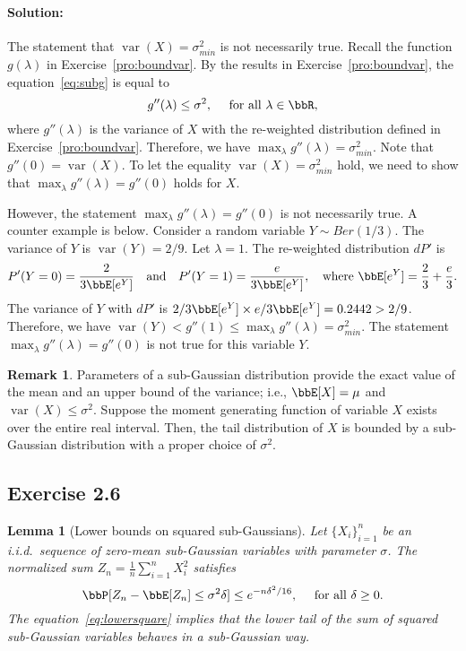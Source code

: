 \documentclass[11pt]{article}
\DeclareMathOperator{\var}{var}
\theoremstyle{plain}
\newtheorem{lem}{Lemma}
\theoremstyle{definition}
\newtheorem{rmk}{Remark}
\begin{document}
\paragraph{Solution:} The statement that $\var(X) = \sigma_{min}^2$ is not necessarily true. Recall the function $g(\lambda)$ in Exercise~\ref{pro:boundvar}. By the results in Exercise~\ref{pro:boundvar},  the equation~\eqref{eq:subg} is equal to 
\begin{equation}\label{eq:question}
	g''(\lambda) \leq  \sigma^2, \quad \text{ for all } \lambda \in \bbR,
\end{equation}
where $g'' (\lambda)$ is the variance of $X$ with the re-weighted distribution defined in Exercise~\ref{pro:boundvar}. Therefore, we have $\max_{\lambda}g''(\lambda) = \sigma_{min}^2$. Note that $g''(0) = \var(X)$. To let the equality $\var(X) = \sigma_{min}^2$ hold, we need to show that $\max_{\lambda}g''(\lambda) = g''(0)$ holds for $X$. 

\vspace{0.2cm}
However, the statement $\max_{\lambda}g''(\lambda) = g''(0)$ is not necessarily true.  A counter example is below. 
Consider a random variable $Y \sim Ber(1/3)$. The variance of $Y$ is $\var(Y) = 2/9$. Let $\lambda = 1$. The re-weighted distribution $dP'$ is
\[ P'(Y = 0) = \frac{2}{3\bbE[ e^{Y} ]}\quad  \text{and}\quad  P'(Y = 1) = \frac{e}{3 \bbE[ e^{ Y } ]}, \quad \text{where } \bbE[ e^{Y} ] = \frac{2}{3} + \frac{e}{3}.  \]
The variance of $Y$ with $dP'$ is ${2}/{3\bbE[ e^{Y} ]} \times  {e}/{3\bbE[ e^{Y} ]} = 0.2442 > 2/9$. Therefore, we have $\var(Y) <  g''(1) \leq \max_{\lambda}g''(\lambda) = \sigma^2_{min}$. The statement $\max_{\lambda}g''(\lambda) = g''(0)$ is not true for this variable $Y$.
\begin{rmk}
	Parameters of a sub-Gaussian distribution provide the exact value of the mean and an upper bound of the variance; i.e., $ \bbE[X] = \mu$ and $\var(X) \leq \sigma^2$. Suppose the moment generating function of variable  $X$ exists over the entire real interval. Then, the tail distribution of $X$ is bounded by a sub-Gaussian distribution with a proper choice of $\sigma^2$.
\end{rmk}



\subsection{Exercise 2.6}


\begin{lem}[Lower bounds on squared sub-Gaussians]\label{lem:lowersquare} Let $\{ X_i \}_{i=1}^n$ be an i.i.d.\ sequence of zero-mean sub-Gaussian variables with parameter $\sigma$. The normalized sum $Z_n = \frac{1}{n} \sum_{i=1}^n X_i^2$ satisfies
\begin{equation}\label{eq:lowersquare}
	\bbP[Z_n - \bbE[Z_n] \leq \sigma^2 \delta ] \leq e^{-n\delta^2 /16}, \quad \text{ for all } \delta \geq 0.
\end{equation}
	The equation~\eqref{eq:lowersquare} implies that the lower tail of the sum of squared sub-Gaussian variables behaves in a sub-Gaussian way.
\end{lem}
\end{document}
